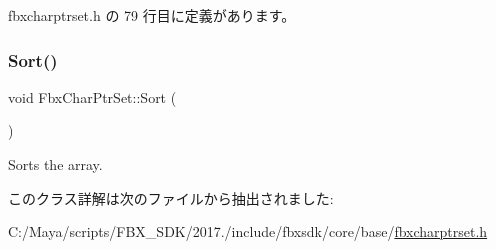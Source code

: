  fbxcharptrset.\+h の 79 行目に定義があります。

\mbox{\label{class_fbx_char_ptr_set_a54d7c3c3b927eb0040f0235b5aaff717}} 
\subsubsection{\texorpdfstring{Sort()}{Sort()}}
{\footnotesize\ttfamily void Fbx\+Char\+Ptr\+Set\+::\+Sort (\begin{DoxyParamCaption}{ }\end{DoxyParamCaption})}



Sorts the array. 



このクラス詳解は次のファイルから抽出されました\+:\begin{DoxyCompactItemize}
\item 
C\+:/\+Maya/scripts/\+F\+B\+X\+\_\+\+S\+D\+K/2017./include/fbxsdk/core/base/\hyperlink{fbxcharptrset_8h}{fbxcharptrset.\+h}\end{DoxyCompactItemize}

